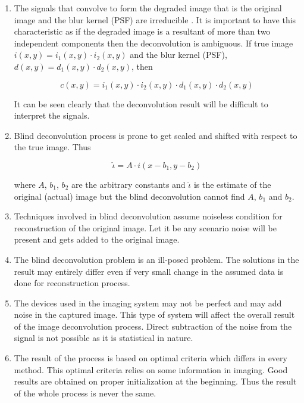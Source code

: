 \documentclass{article}
\begin{document}
\begin{enumerate}
    \item The signals that convolve to form the degraded image that is the original image and the blur kernel (PSF) are irreducible \cite{jiang-ming}. It is important to have this characteristic as if the degraded image is a resultant of more than two independent components then the deconvolution is ambiguous. If true image $i(x, y) = i_{1}(x, y) \cdot i_{2}(x,y)$ and the blur kernel (PSF), $d(x, y) = d_{1}(x, y) \cdot d_{2}(x, y)$, then
    
    \begin{equation}
        c(x, y) = i_{1}(x, y)\cdot i_{2}(x, y) \cdot d_{1}(x, y) \cdot d_{2}(x, y)
    \end{equation}
    
    It can be seen clearly that the deconvolution result will be difficult to interpret the signals.   
    
    \item Blind deconvolution process is prone to get scaled and shifted with respect to the true image. Thus 
    
    \begin{equation}
        \hat{\iota} = A \cdot i(x - b_{1}, y - b_{2})
    \end{equation}
    
    where $A$, $b_1$, $b_2$ are the arbitrary constants and $\hat{\iota}$ is the estimate of the original (actual) image but the blind deconvolution cannot find $A$, $b_1$ and $b_2$. 
    
    \item Techniques involved in blind deconvolution assume noiseless condition for reconstruction of the original image. Let it be any scenario noise will be present and gets added to the original image.
    
    \item The blind deconvolution problem is an ill-posed problem. The solutions in the result may entirely differ even if very small change in the assumed data is done for reconstruction process.
    
    \item The devices used in the imaging system may not be perfect and may add noise in the captured image. This type of system will affect the overall result of the image deconvolution process. Direct subtraction of the noise from the signal is not possible as it is statistical in nature. 
    
    \item The result of the process is based on optimal criteria which differs in every method. This optimal criteria relies on some information in imaging. Good results are obtained on proper initialization at the beginning. Thus the result of the whole process is never the same.  
    

\end{enumerate}
\end{document}
